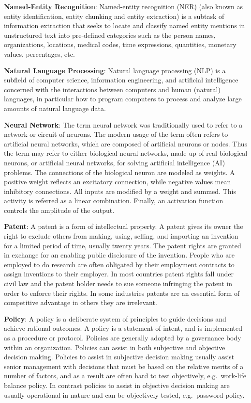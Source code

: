 \documentclass[]{book}
\theoremstyle{definition}
\theoremstyle{definition}
\theoremstyle{definition}
\theoremstyle{remark}
\begin{document}
\textbf{Named-Entity Recognition}: Named-entity recognition (NER) (also
known as entity identification, entity chunking and entity extraction)
is a subtask of information extraction that seeks to locate and classify
named entity mentions in unstructured text into pre-defined categories
such as the person names, organizations, locations, medical codes, time
expressions, quantities, monetary values, percentages, etc.

\textbf{Natural Language Processing}: Natural language processing (NLP)
is a subfield of computer science, information engineering, and
artificial intelligence concerned with the interactions between
computers and human (natural) languages, in particular how to program
computers to process and analyze large amounts of natural language data.

\textbf{Neural Network}: The term neural network was traditionally used
to refer to a network or circuit of neurons. The modern usage of the
term often refers to artificial neural networks, which are composed of
artificial neurons or nodes. Thus the term may refer to either
biological neural networks, made up of real biological neurons, or
artificial neural networks, for solving artificial intelligence (AI)
problems. The connections of the biological neuron are modeled as
weights. A positive weight reflects an excitatory connection, while
negative values mean inhibitory connections. All inputs are modified by
a weight and summed. This activity is referred as a linear combination.
Finally, an activation function controls the amplitude of the output.

\textbf{Patent}: A patent is a form of intellectual property. A patent
gives its owner the right to exclude others from making, using, selling,
and importing an invention for a limited period of time, usually twenty
years. The patent rights are granted in exchange for an enabling public
disclosure of the invention. People who are employed to do research are
often obligated by their employment contracts to assign inventions to
their employer. In most countries patent rights fall under civil law and
the patent holder needs to sue someone infringing the patent in order to
enforce their rights. In some industries patents are an essential form
of competitive advantage in others they are irrelevant.

\textbf{Policy}: A policy is a deliberate system of principles to guide
decisions and achieve rational outcomes. A policy is a statement of
intent, and is implemented as a procedure or protocol. Policies are
generally adopted by a governance body within an organization. Policies
can assist in both subjective and objective decision making. Policies to
assist in subjective decision making usually assist senior management
with decisions that must be based on the relative merits of a number of
factors, and as a result are often hard to test objectively,
e.g.~work-life balance policy. In contrast policies to assist in
objective decision making are usually operational in nature and can be
objectively tested, e.g.~password policy.
\end{document}
